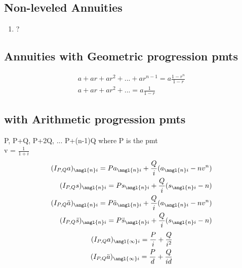 \documentclass[12pt]{article}
\begin{document}
\subsection{Non-leveled Annuities}
\begin{enumerate}
	\item ?
\end{enumerate}

\subsection{Annuities with Geometric progression pmts}
\begin{align}
	a + ar + ar^2 + ... + ar^{n-1} = a \frac{1-r^n}{1 - r} \nonumber \\
	a + ar + ar^2 + ... = a \frac{1}{1-r} \nonumber
\end{align}

\subsection{with Arithmetic progression pmts}
P, P+Q, P+2Q, ... P+(n-1)Q where P is the pmt \\
v = $\frac{1}{1+i}$ 
\begin{align}
	(I_{P,Q}a)_{\angl{n}i} = Pa_{\angl{n}i} + \frac{Q}{i}(a_{\angl{n}i} - nv^n) \nonumber \\	
	(I_{P,Q}s)_{\angl{n}i} = Ps_{\angl{n}i} + \frac{Q}{i}(s_{\angl{n}i} - n) \nonumber \\
	(I_{P,Q}\ddot{a})_{\angl{n}i} = P\ddot{a}_{\angl{n}i} + \frac{Q}{i}(a_{\angl{n}i} - nv^n) \nonumber \\	
	(I_{P,Q}\ddot{s})_{\angl{n}i} = P\ddot{s}_{\angl{n}i} + \frac{Q}{i}(s_{\angl{n}i} - n) \nonumber 
\end{align}
\begin{align}
	(I_{P,Q}a)_{\angl{\infty}i} = \frac{P}{i} + \frac{Q}{i^2} \nonumber \\		
	(I_{P,Q}\ddot{a})_{\angl{\infty}i} = \frac{P}{d} + \frac{Q}{id} \nonumber
\end{align}
\end{document}
